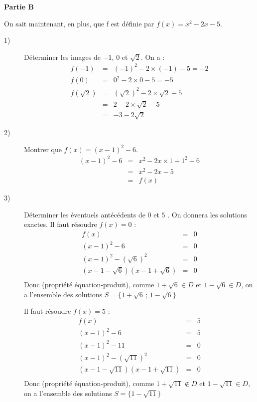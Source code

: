 \bigskip
\centerline{\bf Partie B}
\bigskip
On sait maintenant, en plus, que f est définie par $f(x) = x^2-2 x -5$.
\begin{description}
\item[1)] 
Déterminer les images de $-1$, $0$ et $\sqrt{2}$.
On a : 
\begin{eqnarray*}
 f(-1) &=& (-1)^2 - 2 \times (-1) -5 = -2\\
  f(0) &=& 0^2 - 2 \times 0 -5 = -5\\
    f(\sqrt{2}) &=& (\sqrt{2})^2 - 2 \times \sqrt{2} -5 \\
     &=& 2 - 2 \times \sqrt{2} -5 \\
       &=& -3 - 2  \sqrt{2}  
\end{eqnarray*}
\item[2)] 
Montrer que $f(x) = (x-1)^2 -6 $. 
\begin{eqnarray*}
 (x-1)^2 -6  &=& x^2 - 2 x\times 1 + 1^2 - 6 \\
  &=& x^2 - 2 x -5 \\
  &=& f(x) 
\end{eqnarray*}

\item[3)] 
Déterminer les éventuels antécédents de $0$ et $5$ . On donnera les solutions exactes. 
Il faut résoudre $f(x)=0$ : 
\begin{eqnarray*}
 f(x) &=& 0 \\
 (x-1)^2 -6  &=&0 \\
 (x-1)^2 -(\sqrt{6})^2  &=&0 \\
 (x-1-\sqrt{6})  (x-1+\sqrt{6}) &=&0 \\
\end{eqnarray*}
Donc (propriété équation-produit), comme $1+\sqrt{6}\in D$ et $1-\sqrt{6}\in D$, on a l'ensemble des solutions $ S = \{1+\sqrt{6} \,;\,1-\sqrt{6} \}$ %

Il faut résoudre $f(x)=5$ : 
\begin{eqnarray*}
 f(x) &=&5 \\
 (x-1)^2 -6  &=&5 \\
  (x-1)^2 -11  &=&0 \\
 (x-1)^2 -(\sqrt{11})^2  &=&0 \\
 (x-1-\sqrt{11})  (x-1+\sqrt{11}) &=&0 \\
\end{eqnarray*}
Donc (propriété équation-produit), comme $1+\sqrt{11}\not\in D$ et $1-\sqrt{11}\in D$, on a l'ensemble des solutions $ S = \{1-\sqrt{11} \}$ %
\end{description}
